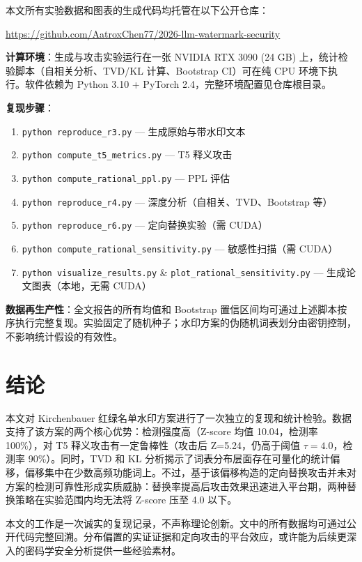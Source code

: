 \documentclass[11pt,a4paper]{article}
\begin{document}
本文所有实验数据和图表的生成代码均托管在以下公开仓库：

\begin{center}
\url{https://github.com/AatroxChen77/2026-llm-watermark-security}
\end{center}

\textbf{计算环境}：生成与攻击实验运行在一张 NVIDIA RTX 3090 (24 GB) 上，统计检验脚本（自相关分析、TVD/KL 计算、Bootstrap CI）可在纯 CPU 环境下执行。软件依赖为 Python 3.10 + PyTorch 2.4，完整环境配置见仓库根目录。

\textbf{复现步骤}：
\begin{enumerate}
    \item \texttt{python reproduce\_r3.py} — 生成原始与带水印文本
    \item \texttt{python compute\_t5\_metrics.py} — T5 释义攻击
    \item \texttt{python compute\_rational\_ppl.py} — PPL 评估
    \item \texttt{python reproduce\_r4.py} — 深度分析（自相关、TVD、Bootstrap 等）
    \item \texttt{python reproduce\_r6.py} — 定向替换实验（需 CUDA）
    \item \texttt{python compute\_rational\_sensitivity.py} — 敏感性扫描（需 CUDA）
    \item \texttt{python visualize\_results.py} \& \texttt{plot\_rational\_sensitivity.py} — 生成论文图表（本地，无需 CUDA）
\end{enumerate}

\textbf{数据再生产性}：全文报告的所有均值和 Bootstrap 置信区间均可通过上述脚本按序执行完整复现。实验固定了随机种子；水印方案的伪随机词表划分由密钥控制，不影响统计假设的有效性。

\section{结论}
本文对 Kirchenbauer 红绿名单水印方案进行了一次独立的复现和统计检验。数据支持了该方案的两个核心优势：检测强度高（Z-score 均值 10.04，检测率 100\%），对 T5 释义攻击有一定鲁棒性（攻击后 Z=5.24，仍高于阈值 $\tau=4.0$，检测率 90\%）。同时，TVD 和 KL 分析揭示了词表分布层面存在可量化的统计偏移，偏移集中在少数高频功能词上。不过，基于该偏移构造的定向替换攻击并未对方案的检测可靠性形成实质威胁：替换率提高后攻击效果迅速进入平台期，两种替换策略在实验范围内均无法将 Z-score 压至 4.0 以下。

本文的工作是一次诚实的复现记录，不声称理论创新。文中的所有数据均可通过公开代码完整回溯。分布偏置的实证证据和定向攻击的平台效应，或许能为后续更深入的密码学安全分析提供一些经验素材。



\end{document}
